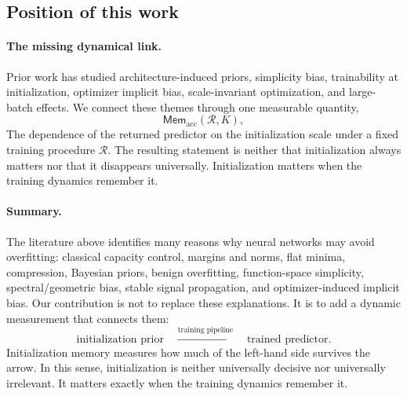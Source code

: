 \documentclass{article}
\begin{document}
\subsection{Position of this work}
\label{app:related-position}

\paragraph{The missing dynamical link.}
Prior work has studied architecture-induced priors, simplicity bias, trainability at initialization, optimizer implicit bias, scale-invariant optimization, and large-batch effects.  We connect these themes through one measurable quantity,
\[
    \mathsf{Mem}_{\mathrm{acc}}(\mathcal R,K),
\]
The dependence of the returned predictor on the initialization scale under a fixed training procedure $\mathcal R$.  The resulting statement is neither that initialization always matters nor that it disappears universally.  Initialization matters when the training dynamics remember it.

\paragraph{Summary.}
The literature above identifies many reasons why neural networks may avoid overfitting: classical capacity control, margins and norms, flat minima, compression, Bayesian priors, benign overfitting, function-space simplicity, spectral/geometric bias, stable signal propagation, and optimizer-induced implicit bias.  Our contribution is not to replace these explanations.  It is to add a dynamic measurement that connects them:
\[
    \text{initialization prior}
    \quad\xrightarrow{\text{training pipeline}}\quad
    \text{trained predictor}.
\]
Initialization memory measures how much of the left-hand side survives the arrow.  In this sense, initialization is neither universally decisive nor universally irrelevant.  It matters exactly when the training dynamics remember it.
\end{document}

